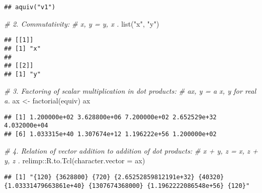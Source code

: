 \documentclass[
]{article}
\newenvironment{Shaded}{\begin{snugshade}}{\end{snugshade}}
\newcommand{\AttributeTok}[1]{\textcolor[rgb]{0.77,0.63,0.00}{#1}}
\newcommand{\CommentTok}[1]{\textcolor[rgb]{0.56,0.35,0.01}{\textit{#1}}}
\newcommand{\FunctionTok}[1]{\textcolor[rgb]{0.00,0.00,0.00}{#1}}
\newcommand{\NormalTok}[1]{#1}
\newcommand{\OtherTok}[1]{\textcolor[rgb]{0.56,0.35,0.01}{#1}}
\newcommand{\SpecialCharTok}[1]{\textcolor[rgb]{0.00,0.00,0.00}{#1}}
\newcommand{\StringTok}[1]{\textcolor[rgb]{0.31,0.60,0.02}{#1}}
\begin{document}
\begin{verbatim}
## aquiv("v1")
\end{verbatim}

\begin{Shaded}
\begin{Highlighting}[]
\CommentTok{\# 2. Commutativity:}
\CommentTok{\# x, y = y, x .}
\FunctionTok{list}\NormalTok{(}\StringTok{"x"}\NormalTok{, }\StringTok{"y"}\NormalTok{)}
\end{Highlighting}
\end{Shaded}

\begin{verbatim}
## [[1]]
## [1] "x"
## 
## [[2]]
## [1] "y"
\end{verbatim}

\begin{Shaded}
\begin{Highlighting}[]
\CommentTok{\# 3. Factoring of scalar multiplication in dot products:}
\CommentTok{\# ax, y = a x, y for real a.}
\NormalTok{ax }\OtherTok{\textless{}{-}} \FunctionTok{factorial}\NormalTok{(equiv)}
\NormalTok{ax}
\end{Highlighting}
\end{Shaded}

\begin{verbatim}
## [1] 1.200000e+02 3.628800e+06 7.200000e+02 2.652529e+32 4.032000e+04
## [6] 1.033315e+40 1.307674e+12 1.196222e+56 1.200000e+02
\end{verbatim}

\begin{Shaded}
\begin{Highlighting}[]
\CommentTok{\# 4. Relation of vector addition to addition of dot products:}
\CommentTok{\# x + y, z = x, z + y, z .}
\NormalTok{relimp}\SpecialCharTok{::}\FunctionTok{R.to.Tcl}\NormalTok{(}\AttributeTok{character.vector =}\NormalTok{ ax)}
\end{Highlighting}
\end{Shaded}

\begin{verbatim}
## [1] "{120} {3628800} {720} {2.65252859812191e+32} {40320} {1.03331479663861e+40} {1307674368000} {1.1962222086548e+56} {120}"
\end{verbatim}
\end{document}
